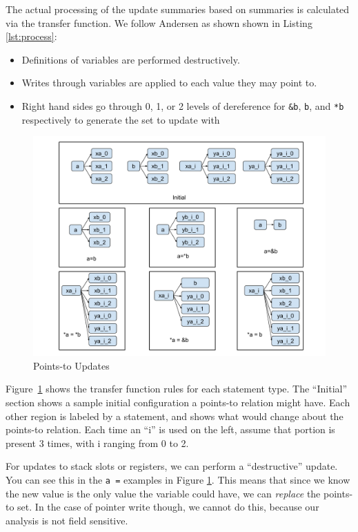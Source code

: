 The actual processing of the update summaries based on summaries is
calculated via the transfer function.  We follow Andersen as shown
shown in Listing \ref{lst:process}:
\begin{itemize}
\item Definitions of variables are performed destructively.
\item Writes through variables are applied to each value they may point to.
\item Right hand sides go through 0, 1, or 2 levels of dereference for \texttt{\&b}, \texttt{b}, and \texttt{*b} respectively to generate the set to update with
\end{itemize}

\begin{figure}
	\centering
	\includegraphics[scale=0.35]{alias/pts-update.pdf}
	\caption{Points-to Updates}
	\label{fig:pts-update}
\end{figure}

Figure~\ref{fig:pts-update} shows the transfer function rules for each
statement type.
The ``Initial'' section shows a sample initial configuration a points-to relation might have.
Each other region is labeled by a statement, and shows what would change about the points-to relation.
Each time an ``i'' is used on the left, assume that portion is present 3 times, with i ranging from 0 to 2.

For updates to stack slots or registers, we can perform a ``destructive'' update.
You can see this in the \texttt{a =} examples in Figure \ref{fig:pts-update}.
This means that since we know the new value
is the only value the variable could have, we can \emph{replace} the
points-to set.  In the case of pointer write though, we cannot do
this, because our analysis is not field sensitive.

